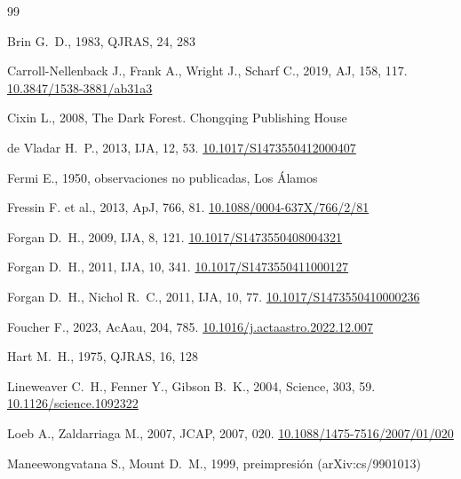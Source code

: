 \documentclass[11pt,a4paper,onecolumn]{article}
\newcommand{\doi}[1]{\href{https://doi.org/#1}{#1}}
\begin{document}
\begin{thebibliography}{99}

Brin G.~D., 1983, QJRAS, 24, 283

Carroll-Nellenback J., Frank A., Wright J., Scharf C., 2019, AJ, 158, 117.
\newblock \doi{10.3847/1538-3881/ab31a3}

Cixin L., 2008, The Dark Forest. Chongqing Publishing House

de Vladar H.~P., 2013, IJA, 12, 53.
\newblock \doi{10.1017/S1473550412000407}

Fermi E., 1950, observaciones no publicadas, Los Álamos

Fressin F. et al., 2013, ApJ, 766, 81.
\newblock \doi{10.1088/0004-637X/766/2/81}

Forgan D.~H., 2009, IJA, 8, 121.
\newblock \doi{10.1017/S1473550408004321}

Forgan D.~H., 2011, IJA, 10, 341.
\newblock \doi{10.1017/S1473550411000127}

Forgan D.~H., Nichol R.~C., 2011, IJA, 10, 77.
\newblock \doi{10.1017/S1473550410000236}

Foucher F., 2023, AcAau, 204, 785.
\newblock \doi{10.1016/j.actaastro.2022.12.007}

Hart M.~H., 1975, QJRAS, 16, 128

Lineweaver C.~H., Fenner Y., Gibson B.~K., 2004, Science, 303, 59.
\newblock \doi{10.1126/science.1092322}

Loeb A., Zaldarriaga M., 2007, JCAP, 2007, 020.
\newblock \doi{10.1088/1475-7516/2007/01/020}

Maneewongvatana S., Mount D.~M., 1999, preimpresión (arXiv:cs/9901013)


\end{thebibliography}
\end{document}
